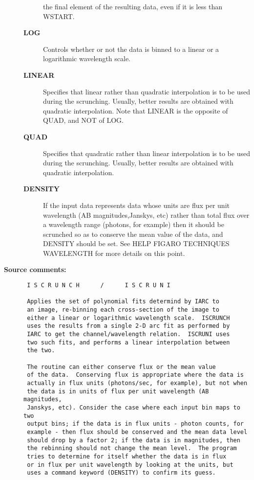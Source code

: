 \begin{description}
\begin{description}
 the final element of the resulting data, even if it is less
 than WSTART.
\item [{\bf LOG}]
 Controls whether or not the data is binned to a linear
 or a logarithmic wavelength scale.
\item [{\bf LINEAR}]
 Specifies that linear rather than quadratic
 interpolation is to be used during the scrunching.  Usually,
 better results are obtained with quadratic interpolation.
 Note that LINEAR is the opposite of QUAD, and NOT of LOG.
\item [{\bf QUAD}]
 Specifies that quadratic rather than linear
 interpolation is to be used during the scrunching.  Usually,
 better results are obtained with quadratic interpolation.
\item [{\bf DENSITY}]
 If the input data represents data whose units are flux per
 unit wavelength (AB magnitudes,Janskys, etc) rather than
 total flux over a wavelength range (photons, for example)
 then it should be scrunched so as to conserve the mean
 value of the data, and DENSITY should be set.  See HELP
 FIGARO TECHNIQUES WAVELENGTH for more details on this point.
\end{description}

\item [{\bf Source comments:}]
\begin{verbatim}
 I S C R U N C H      /      I S C R U N I

 Applies the set of polynomial fits determind by IARC to
 an image, re-binning each cross-section of the image to
 either a linear or logarithmic wavelength scale.  ISCRUNCH
 uses the results from a single 2-D arc fit as performed by
 IARC to get the channel/wavelength relation.  ISCRUNI uses
 two such fits, and performs a linear interpolation between
 the two.

 The routine can either conserve flux or the mean value
 of the data.  Conserving flux is appropriate where the data is
 actually in flux units (photons/sec, for example), but not when
 the data is in units of flux per unit wavelength (AB magnitudes,
 Janskys, etc). Consider the case where each input bin maps to two
 output bins; if the data is in flux units - photon counts, for
 example - then flux should be conserved and the mean data level
 should drop by a factor 2; if the data is in magnitudes, then
 the rebinning should not change the mean level.  The program
 tries to determine for itself whether the data is in flux
 or in flux per unit wavelength by looking at the units, but
 uses a command keyword (DENSITY) to confirm its guess.


\end{verbatim}
\end{description}
